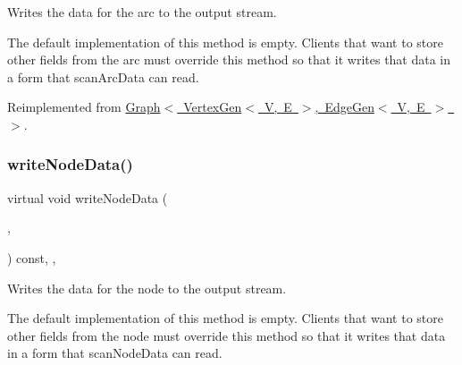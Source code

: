 Writes the data for the arc to the output stream. 

The default implementation of this method is empty. Clients that want to store other fields from the arc must override this method so that it writes that data in a form that scan\+Arc\+Data can read. 

Reimplemented from \mbox{\hyperlink{classGraph_ac9ab61a83ff4792f63e9e110b534cdfd}{Graph$<$ Vertex\+Gen$<$ V, E $>$, Edge\+Gen$<$ V, E $>$ $>$}}.

\mbox{\label{classGraph_ac0db5231476c8cb10655d58ebc108b78}} 
\subsubsection{\texorpdfstring{write\+Node\+Data()}{writeNodeData()}}
{\footnotesize\ttfamily virtual void write\+Node\+Data (\begin{DoxyParamCaption}\item[{std\+::ostream \&}]{,  }\item[{\mbox{\hyperlink{classVertexGen}{Vertex\+Gen}}$<$ V, E $>$  $\ast$}]{ }\end{DoxyParamCaption}) const\hspace{0.3cm}{\ttfamily [inline]}, {\ttfamily [virtual]}, {\ttfamily [inherited]}}



Writes the data for the node to the output stream. 

The default implementation of this method is empty. Clients that want to store other fields from the node must override this method so that it writes that data in a form that scan\+Node\+Data can read. 